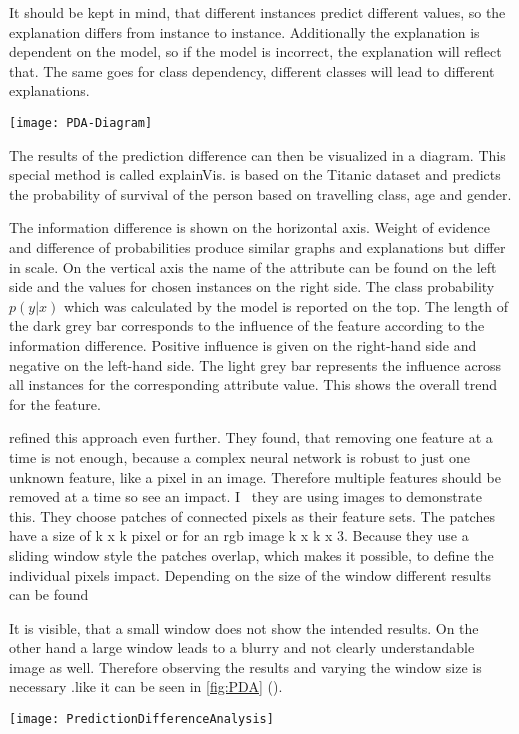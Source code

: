 It should be kept in mind, that different instances predict different values, so the explanation differs from instance to instance. Additionally the explanation is dependent on the model, so if the model is incorrect, the explanation will reflect that. The same goes for class dependency, different classes will lead to different explanations.
\begin{figure*}[h]
    \center
    \texttt{[image: PDA-Diagram]}
    \caption{Prediction Difference Analysis on Titanic-datase~ \cite{RobnikSikonja.2008}}
    \label{fig:PDA-titanic}
\end{figure*}
The results of the prediction difference can then be visualized in a diagram. This special method is called explainVis.  is based on the Titanic dataset and predicts the probability of survival of the person based on travelling class, age and gender.
\par
The information difference is shown on the horizontal axis. Weight of evidence and difference of probabilities produce similar graphs and explanations but differ in scale. On the vertical axis the name of the attribute can be found on the left side and the values for chosen instances on the right side. The class probability 
\(p(y|x)\)
 which was calculated by the model is reported on the top.
The length of the dark grey bar corresponds to the influence of the feature according to the information difference. Positive influence is given on the right-hand side and negative on the left-hand side. The light grey bar represents the influence across all instances for the corresponding attribute value. This shows the overall trend for the feature.
\par
{} refined this approach even further. They found, that removing one feature at a time is not enough, because a complex neural network is robust to just one unknown feature, like a pixel in an image. Therefore multiple features should be removed at a time so see an impact. I~ \cite{Zintgraf.2017} they are using images to demonstrate this. They choose patches of connected pixels as their feature sets. The patches have a size of k x k pixel or for an rgb image k x k x 3. Because they use a sliding window style the patches overlap, which makes it possible, to define the individual pixels impact. Depending on the size of the window different results can be found 
\par
It is visible, that a small window does not show the intended results. On the other hand a large window leads to a blurry and not clearly understandable image as well. Therefore observing the results and varying the window size is necessary .like it can be seen in \cref{fig:PDA} (\cite{Zintgraf.2017}). 
\begin{figure*}[h]
    \center
    \texttt{[image: PredictionDifferenceAnalysis]}
    \caption{Prediction Difference Analysis with different window size~ \cite{Zintgraf.2017}}
    \label{fig:PDA}
\end{figure*}


